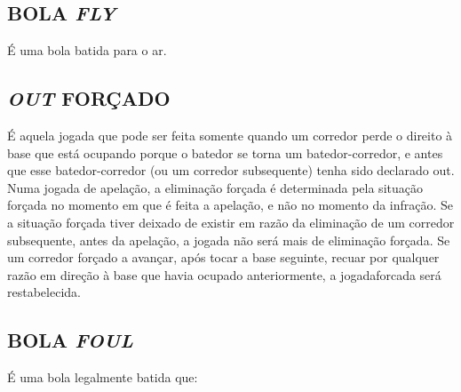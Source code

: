 \subsection{BOLA \textit{FLY}}

É uma bola batida para o ar.

\subsection{\textit{OUT} FORÇADO}

É aquela jogada que pode ser feita somente quando um corredor perde o direito à base que está ocupando porque o batedor se torna um batedor-corredor, e  antes que esse batedor-corredor (ou um corredor subsequente) tenha sido declarado \gls{out}. Numa jogada de apelação, a eliminação forçada é determinada pela situação forçada no momento em que é feita a apelação, e não no momento da infração. Se a situação forçada tiver deixado de existir em razão da eliminação de um corredor subsequente, antes da apelação, a jogada não será mais de eliminação forçada. Se um corredor forçado a avançar, após tocar a base seguinte, recuar por qualquer razão em direção à base que havia ocupado anteriormente, a \gls{jogadaforcada} será restabelecida.

\subsection{BOLA \textit{FOUL}}
É uma bola legalmente batida que:

